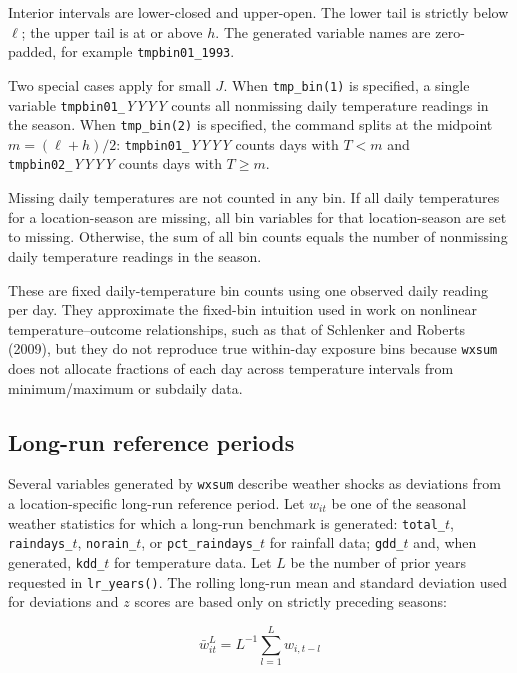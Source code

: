 \noindent Interior intervals are lower-closed and upper-open. The lower tail is strictly below $\ell$; the upper tail is at or above $h$. The generated variable names are zero-padded, for example \texttt{tmpbin01\_1993}.

Two special cases apply for small $J$. When \texttt{tmp\_bin(1)} is specified, a single variable \texttt{tmpbin01\_}\textit{YYYY} counts all nonmissing daily temperature readings in the season. When \texttt{tmp\_bin(2)} is specified, the command splits at the midpoint $m = (\ell + h) / 2$: \texttt{tmpbin01\_}\textit{YYYY} counts days with $T < m$ and \texttt{tmpbin02\_}\textit{YYYY} counts days with $T \geq m$.

Missing daily temperatures are not counted in any bin. If all daily temperatures for a location-season are missing, all bin variables for that location-season are set to missing. Otherwise, the sum of all bin counts equals the number of nonmissing daily temperature readings in the season.

These are fixed daily-temperature bin counts using one observed daily reading per day. They approximate the fixed-bin intuition used in work on nonlinear temperature--outcome relationships, such as that of Schlenker and Roberts (2009), but they do not reproduce true within-day exposure bins because \texttt{wxsum} does not allocate fractions of each day across temperature intervals from minimum/maximum or subdaily data.

\subsection{Long-run reference periods}

Several variables generated by \texttt{wxsum} describe weather shocks as deviations from a location-specific long-run reference period. Let $w_{it}$ be one of the seasonal weather statistics for which a long-run benchmark is generated: \texttt{total\_}$t$, \texttt{raindays\_}$t$, \texttt{norain\_}$t$, or \texttt{pct\_raindays\_}$t$ for rainfall data; \texttt{gdd\_}$t$ and, when generated, \texttt{kdd\_}$t$ for temperature data. Let $L$ be the number of prior years requested in \texttt{lr\_years()}. The rolling long-run mean and standard deviation used for deviations and $z$ scores are based only on strictly preceding seasons:

\begin{equation}
	\bar{w}_{it}^{L} = L^{-1} \sum_{l = 1}^{L} w_{i, t - l}
\end{equation}

